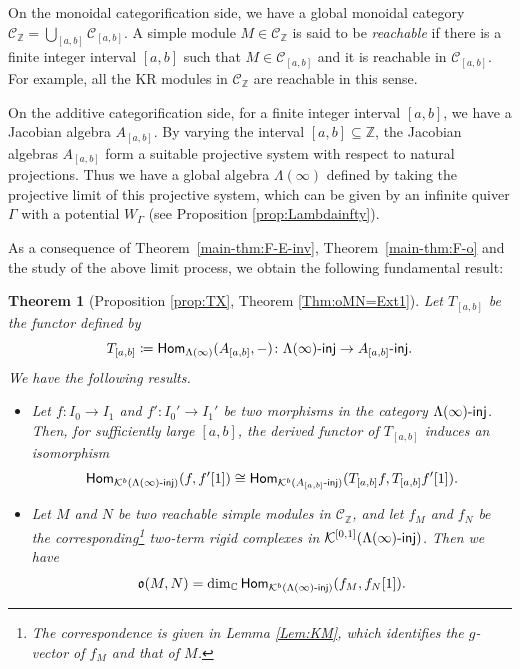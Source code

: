 \documentclass[12pt]{amsart}
\newtheorem{theorem}{Theorem}[section]
\theoremstyle{definition}
\theoremstyle{remark}
\numberwithin{equation}{section}
\newcommand{\opname}[1]{\operatorname{\mathsf{#1}}}
\newcommand{\Hom}{\opname{Hom}}
\newcommand{\injc}{\mathchar`-\mathsf{inj}}
\begin{document}
    On the monoidal categorification side, we have a global monoidal category  $\mathcal{C}_\mathbb{Z} = \bigcup_{[a,b]}\mathcal{C}_{[a,b]}$.
    A simple module $M \in \mathcal{C}_\mathbb{Z}$  is said to be {\em reachable} if there is a finite integer interval $[a,b]$ such that $M \in \mathcal{C}_{[a,b]}$ and it is reachable in $\mathcal{C}_{[a,b]}$. 
For example, all the KR modules in $\mathcal{C}_\mathbb{Z}$ are reachable in this sense.

On the additive categorification side, for a finite integer interval $[a,b]$, we have a Jacobian algebra $A_{[a,b]}$. By varying the interval $[a,b]\subseteq \mathbb Z$, the Jacobian algebras $A_{[a,b]}$ form a suitable projective system with respect to natural projections. Thus we have a global algebra $\Lambda(\infty)$ defined by taking the projective limit of this projective system, which can be given by an infinite quiver $\Gamma$ with a potential $W_{\Gamma}$ (see Proposition \ref{prop:Lambdainfty}).

As a consequence of Theorem~\ref{main-thm:F-E-inv}, Theorem~\ref{main-thm:F-o} and the study of the above limit process, we obtain the following fundamental result:

\begin{theorem}[Proposition \ref{prop:TX}, Theorem \ref{Thm:oMN=Ext1}] \label{main-thm:oMN=Ext1} Let $T_{[a,b]}$ be the functor defined by
\[T_{[a,b]}\coloneq \Hom_{\Lambda(\infty)}(A_{[a,b]}, -) \colon \Lambda(\infty)\injc \to A_{[a,b]}\injc.\]
We have the following results.
\begin{itemize}
    \item [(i)] Let $f \colon I_0 \to I_1$ and $f' \colon I_0' \to I_1'$ be two morphisms in the category $\Lambda(\infty)\injc$.
Then, for sufficiently large $[a,b]$, the derived functor of $T_{[a,b]}$ induces an isomorphism
\[ \Hom_{\mathcal{K}^b(\Lambda(\infty)\injc)}(f,f'[1]) \cong \Hom_{\mathcal{K}^b(A_{[a,b]}\injc)}(T_{[a,b]}f, T_{[a,b]}f'[1]).\]

\item[(ii)] Let $M$ and $N$ be two reachable simple modules in $\mathcal{C}_{\mathbb{Z}}$, and let $f_M$ and $f_N$ be the corresponding\footnote{The correspondence is given in Lemma \ref{Lem:KM}, which identifies the $g$-vector of $f_M$ and that of $M$.} two-term rigid complexes in $\mathcal{K}^{[0,1]}(\Lambda(\infty)\injc)$. Then we have
\[  \mathfrak{o}(M,N) = \dim_{\mathbb{C}}\Hom_{\mathcal{K}^b(\Lambda(\infty)\injc)}(f_M, f_N[1]).\]
\end{itemize}
\end{theorem}
\end{document}
